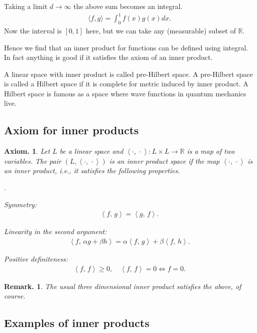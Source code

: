 \documentclass[openany, a4paper, oneside]{jsbook}
\newcounter{enum2}
\renewenvironment{enumerate}{%
\begin{list}%
{%
\arabic{enum2}.\ \,%
}%
{%
\usecounter{enum2}
\setlength{\itemindent}{0pt}%
\setlength{\leftmargin}{15pt}%
\setlength{\rightmargin}{0pt}%
\setlength{\labelsep}{0pt}%
\setlength{\labelwidth}{6pt}%
\setlength{\itemsep}{0pt}%
\setlength{\parsep}{0pt}%
\setlength{\listparindent}{0pt}%
}
}{%
\end{list}%
}
\theoremstyle{break}
\theoremstyle{breakdefn}
\newtheorem{axm}[thm]{Axiom.}
\newtheorem{rem}[thm]{Remark.}
\newcommand{\rbk}[1]{\left (#1\right)}
\newcommand{\bkt}[2]{\left\langle#1,\,#2\right\rangle}
\newcommand{\bbR}{\mathbb{R}}
\begin{document}
Taking a limit $d \to \infty$ the above sum becomes an integral.
\begin{align}
 \langle f, g \rangle
 =
 \int_{0}^{1} f(x) g(x) dx.
\end{align}
Now the interval is $[0, 1]$ here,
but we can take any (measurable) subset of $\bbR$.

Hence we find that an inner product for functions
can be defined using integral.
In fact anything is good if it satisfies the axiom of an inner product.

A linear space with inner product is called pre-Hilbert space.
A pre-Hilbert space is called a Hilbert space if it is complete for metric induced by inner product.
A Hilbert space is famous as a space where wave functions in quantum mechanics live.
\subsection{Axiom for inner products}


\begin{axm}
 Let $L$ be a linear space and $\bkt{\cdot}{\cdot} \colon L \times L \to \bbR$ is a map of two variables.
 The pair $\rbk{L, \bkt{\cdot}{\cdot}}$ is an inner product space if the map $\bkt{\cdot}{\cdot}$ is an inner product,
 i.e., it satisfies the following properties.
\begin{enumerate}
\item Symmetry:
  \begin{align}
   \bkt{f}{g} = \bkt{g}{f}.
  \end{align}
\item Linearity in the second argument:
  \begin{align}
   \bkt{f}{\alpha g + \beta h}
   =
   \alpha \bkt{f}{g} + \beta \bkt{f}{h}.
  \end{align}
\item Positive definiteness:
  \begin{align}
   \bkt{f}{f} \geq 0, \quad
   \bkt{f}{f} = 0 \Longleftrightarrow f = 0.
  \end{align}
\end{enumerate}
\end{axm}
\begin{rem}
 The usual three dimensional inner product satisfies the above, of course.
\end{rem}
\subsection{Examples of inner products}
\end{document}
